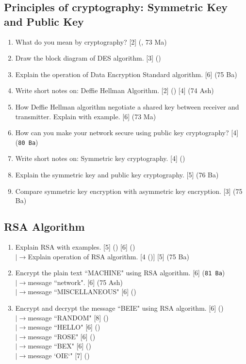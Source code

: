 \documentclass[12pt]{article}
\newcommand{\lb}{\\$\left|\rightarrow\right.$}
\begin{document}
	\subsection{Principles of cryptography: Symmetric Key and Public Key}
		\begin{enumerate}[noitemsep, topsep=0pt]
			\item What do you mean by cryptography? \hfill [2] (, 73 Ma)

			\item Draw the block diagram of DES algorithm. \hfill [3] ()

			\item Explain the operation of Data Encryption Standard algorithm. \hfill [6] (75 Ba)

			\item Write short notes on: Deffie Hellman Algorithm. \hfill [2] () [4] (74 Ash)

			\item How Deffie Hellman algorithm negotiate a shared key between receiver and transmitter. Explain with example. \hfill [6] (73 Ma)

			\item How can you make your network secure using public key cryptography? \hfill [4] (\texttt{80 Ba})

			\item Write short notes on: Symmetric key cryptography. \hfill [4] ()

			\item Explain the symmetric key and public key cryptography. \hfill [5] (76 Ba)

			\item Compare symmetric key encryption with asymmetric key encryption. \hfill [3] (75 Ba)
		\end{enumerate}

	\subsection{RSA Algorithm}
		\begin{enumerate}[noitemsep, topsep=0pt]
			\item Explain RSA with examples. \hfill [5] () [6] ()
			\lb Explain operation of RSA algorithm. \hfill [4 ()] [5] (75 Ba)

			\item Encrypt the plain text ``MACHINE" using RSA algorithm. \hfill [6] (\texttt{81 Ba})
			\lb message ``network". \hfill [6] (75 Ash)
			\lb message ``MISCELLANEOUS" \hfill [6] ()

			\item Encrypt and decrypt the message ``BEIE" using RSA algorithm. \hfill [6] ()
			\lb message ``RANDOM" \hfill [8] ()
			\lb message ``HELLO" \hfill [6] ()
			\lb message ``ROSE" \hfill [6] ()
			\lb message ``BEX" \hfill [6] ()
			\lb message `OIE`" \hfill [7] ()
		\end{enumerate}
\end{document}
